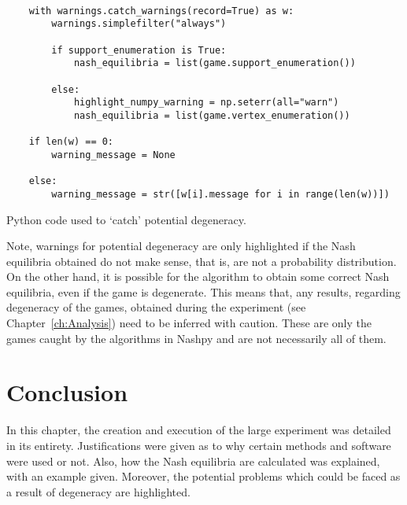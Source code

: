 \begin{listing}
    \begin{verbatim}
    
    with warnings.catch_warnings(record=True) as w:
        warnings.simplefilter("always")

        if support_enumeration is True:
            nash_equilibria = list(game.support_enumeration())

        else:
            highlight_numpy_warning = np.seterr(all="warn")
            nash_equilibria = list(game.vertex_enumeration())

    if len(w) == 0:
        warning_message = None

    else:
        warning_message = str([w[i].message for i in range(len(w))])

    \end{verbatim}
    \caption{Python code used to `catch' potential degeneracy.}\label{ls:warn_code}
\end{listing}

Note, warnings for potential degeneracy are only highlighted if the
Nash equilibria obtained do not make sense, that is, are not a probability
distribution. On the other hand, it is possible for the algorithm to obtain some
correct Nash equilibria, even if the game is degenerate. This means that, any results, regarding degeneracy of the games, obtained during the
experiment (see Chapter~\ref{ch:Analysis}) need to be inferred with caution. These
are only the games caught by the algorithms in Nashpy and are not necessarily
all of them.

\section{Conclusion}
In this chapter, the creation and execution of the large experiment was
detailed in its entirety. Justifications were given as to why certain methods
and software were used or not. Also, how the Nash equilibria are calculated was
explained, with an example given. Moreover, the potential problems which could
be faced as a result of degeneracy are highlighted.